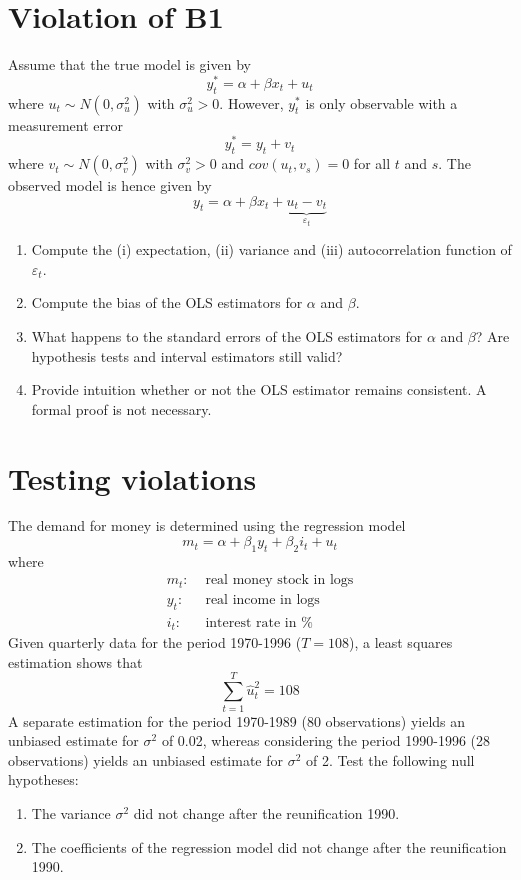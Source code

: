 \documentclass{article}
\begin{document}
\section{Violation of B1}
Assume that the true model is given by
$$y_t^\ast = \alpha + \beta x_t + u_t$$
where $u_t \sim N(0,\sigma_u^2)$ with $\sigma_u^2>0$. However, $y_t^\ast$ is only observable with a measurement error
$$y_t^\ast = y_t + v_t$$
where $v_t \sim N(0,\sigma_v^2)$ with $\sigma_v^2>0$ and $cov(u_t,v_s)=0$ for all $t$ and $s$. The observed model is hence given by
$$ y_t = \alpha + \beta x_t + \underbrace{u_t - v_t}_{\varepsilon_t}$$
\begin{enumerate}[label=(\alph*)]
	\item Compute the (i) expectation, (ii) variance and (iii) autocorrelation function of $\varepsilon_t$.
	\item Compute the bias of the OLS estimators for $\alpha$ and $\beta$.
	\item What happens to the standard errors of the OLS estimators for $\alpha$ and $\beta$? Are hypothesis tests and interval estimators still valid? 
	\item Provide intuition whether or not the OLS estimator remains consistent. A formal proof is not necessary.	
\end{enumerate}

\newpage
\section{Testing violations}
The demand for money is determined using the regression model
$$ m_t = \alpha + \beta_1 y_{t} + \beta_2 i_{t} + u_t$$
where
\begin{align*}
m_t:    & \text{ real money stock in logs}\\
y_{t}: & \text{ real income in logs}\\
i_{t}: & \text{ interest rate in \%}
\end{align*} 
Given quarterly data for the period 1970-1996 ($T=108$), a least squares estimation shows that
$$\sum_{t=1}^T \hat{u}_t^2=108$$
A separate estimation for the period 1970-1989 (80 observations) yields an unbiased estimate for $\sigma^2$ of 0.02, whereas considering the period 1990-1996 (28 observations) yields an unbiased estimate for $\sigma^2$ of 2. Test the following null hypotheses:
\begin{enumerate}[label=(\alph*)]
	\item The variance $\sigma^2$ did not change after the reunification 1990.
	\item The coefficients of the regression model did not change after the reunification 1990.
\end{enumerate}
\newpage
\end{document}
